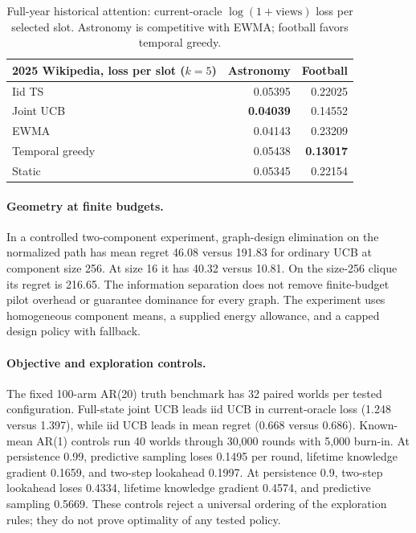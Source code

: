 \documentclass[sigconf,review,anonymous]{acmart}
\begin{document}
\begin{table}[t]\centering\small
\setlength{\tabcolsep}{3pt}
\begin{tabular}{lrr}
\toprule
2025 Wikipedia, loss per slot ($k=5$) & Astronomy & Football \\
\midrule
Iid TS & 0.05395 & 0.22025 \\
Joint UCB & \textbf{0.04039} & 0.14552 \\
EWMA & 0.04143 & 0.23209 \\
Temporal greedy & 0.05438 & \textbf{0.13017} \\
Static & 0.05345 & 0.22154 \\
\bottomrule
\end{tabular}
\caption{Full-year historical attention: current-oracle $\log(1+\mathrm{views})$ loss per selected slot. Astronomy is competitive with EWMA; football favors temporal greedy.}\label{tab:wiki}
\end{table}

\paragraph{Geometry at finite budgets.} In a controlled two-component experiment, graph-design elimination on the normalized path has mean regret 46.08 versus 191.83 for ordinary UCB at component size 256. At size 16 it has 40.32 versus 10.81. On the size-256 clique its regret is 216.65. The information separation does not remove finite-budget pilot overhead or guarantee dominance for every graph. The experiment uses homogeneous component means, a supplied energy allowance, and a capped design policy with fallback.

\paragraph{Objective and exploration controls.} The fixed 100-arm AR(20) truth benchmark has 32 paired worlds per tested configuration. Full-state joint UCB leads iid UCB in current-oracle loss (1.248 versus 1.397), while iid UCB leads in mean regret (0.668 versus 0.686). Known-mean AR(1) controls run 40 worlds through 30,000 rounds with 5,000 burn-in. At persistence 0.99, predictive sampling loses 0.1495 per round, lifetime knowledge gradient 0.1659, and two-step lookahead 0.1997. At persistence 0.9, two-step lookahead loses 0.4334, lifetime knowledge gradient 0.4574, and predictive sampling 0.5669. These controls reject a universal ordering of the exploration rules; they do not prove optimality of any tested policy.
\end{document}

